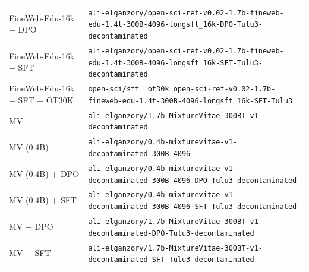 \begin{table}[ht]
\begin{tabular}{lp{10cm}}
FineWeb-Edu-16k + DPO & \texttt{ali-\allowbreak{}elganzory/\allowbreak{}open-\allowbreak{}sci-\allowbreak{}ref-\allowbreak{}v0.02-\allowbreak{}1.7b-\allowbreak{}fineweb-\allowbreak{}edu-\allowbreak{}1.4t-\allowbreak{}300B-\allowbreak{}4096-\allowbreak{}longsft\_16k-\allowbreak{}DPO-\allowbreak{}Tulu3-\allowbreak{}decontaminated} \\
FineWeb-Edu-16k + SFT & \texttt{ali-\allowbreak{}elganzory/\allowbreak{}open-\allowbreak{}sci-\allowbreak{}ref-\allowbreak{}v0.02-\allowbreak{}1.7b-\allowbreak{}fineweb-\allowbreak{}edu-\allowbreak{}1.4t-\allowbreak{}300B-\allowbreak{}4096-\allowbreak{}longsft\_16k-\allowbreak{}SFT-\allowbreak{}Tulu3-\allowbreak{}decontaminated} \\
FineWeb-Edu-16k + SFT + OT30K & \texttt{open-\allowbreak{}sci/\allowbreak{}sft\_\_ot30k\_open-\allowbreak{}sci-\allowbreak{}ref-\allowbreak{}v0.02-\allowbreak{}1.7b-\allowbreak{}fineweb-\allowbreak{}edu-\allowbreak{}1.4t-\allowbreak{}300B-\allowbreak{}4096-\allowbreak{}longsft\_16k-\allowbreak{}SFT-\allowbreak{}Tulu3} \\
MV & \texttt{ali-\allowbreak{}elganzory/\allowbreak{}1.7b-\allowbreak{}MixtureVitae-\allowbreak{}300BT-\allowbreak{}v1-\allowbreak{}decontaminated} \\
MV (0.4B) & \texttt{ali-\allowbreak{}elganzory/\allowbreak{}0.4b-\allowbreak{}mixturevitae-\allowbreak{}v1-\allowbreak{}decontaminated-\allowbreak{}300B-\allowbreak{}4096} \\
MV (0.4B) + DPO & \texttt{ali-\allowbreak{}elganzory/\allowbreak{}0.4b-\allowbreak{}mixturevitae-\allowbreak{}v1-\allowbreak{}decontaminated-\allowbreak{}300B-\allowbreak{}4096-\allowbreak{}DPO-\allowbreak{}Tulu3-\allowbreak{}decontaminated} \\
MV (0.4B) + SFT & \texttt{ali-\allowbreak{}elganzory/\allowbreak{}0.4b-\allowbreak{}mixturevitae-\allowbreak{}v1-\allowbreak{}decontaminated-\allowbreak{}300B-\allowbreak{}4096-\allowbreak{}SFT-\allowbreak{}Tulu3-\allowbreak{}decontaminated} \\
MV + DPO & \texttt{ali-\allowbreak{}elganzory/\allowbreak{}1.7b-\allowbreak{}MixtureVitae-\allowbreak{}300BT-\allowbreak{}v1-\allowbreak{}decontaminated-\allowbreak{}DPO-\allowbreak{}Tulu3-\allowbreak{}decontaminated} \\
MV + SFT & \texttt{ali-\allowbreak{}elganzory/\allowbreak{}1.7b-\allowbreak{}MixtureVitae-\allowbreak{}300BT-\allowbreak{}v1-\allowbreak{}decontaminated-\allowbreak{}SFT-\allowbreak{}Tulu3-\allowbreak{}decontaminated} \\

\end{tabular}
\end{table}

